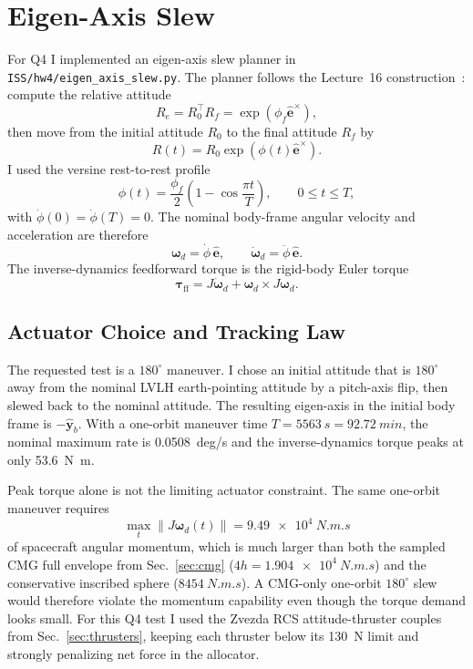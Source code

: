 \documentclass[conference]{IEEEtran}
\begin{document}
\section{Eigen-Axis Slew}
\label{sec:slew}

For Q4 I implemented an eigen-axis slew planner in
\texttt{ISS/hw4/eigen\_axis\_slew.py}.  The planner follows the
Lecture~16 construction~\cite{manchester_l16}: compute the relative
attitude
\[
  R_e = R_0^\top R_f = \exp(\phi_f \hat{\bm e}^{\times}),
\]
then move from the initial attitude $R_0$ to the final attitude $R_f$
by
\begin{equation}
  R(t) = R_0 \exp(\phi(t)\hat{\bm e}^{\times}).
  \label{eq:eigen-axis-path}
\end{equation}
I used the versine rest-to-rest profile
\begin{equation}
  \phi(t) = \frac{\phi_f}{2}\left(1-\cos\frac{\pi t}{T}\right),
  \qquad 0 \le t \le T ,
  \label{eq:versine}
\end{equation}
with $\dot\phi(0)=\dot\phi(T)=0$.  The nominal body-frame angular
velocity and acceleration are therefore
\[
  \bm\omega_d = \dot\phi\,\hat{\bm e}, \qquad
  \dot{\bm\omega}_d = \ddot\phi\,\hat{\bm e}.
\]
The inverse-dynamics feedforward torque is the rigid-body Euler torque
\begin{equation}
  \bm\tau_\text{ff}
  = J\dot{\bm\omega}_d
    + \bm\omega_d\times J\bm\omega_d .
  \label{eq:slew-inv-dyn}
\end{equation}

\subsection{Actuator Choice and Tracking Law}

The requested test is a $180^\circ$ maneuver.  I chose an initial
attitude that is $180^\circ$ away from the nominal LVLH earth-pointing
attitude by a pitch-axis flip, then slewed back to the nominal
attitude.  The resulting eigen-axis in the initial body frame is
$-\hat{\bm y}_b$.  With a one-orbit maneuver time
$T=\SI{5563}{s}=\SI{92.72}{min}$, the nominal maximum rate is
\SI{0.0508}{deg/s} and the inverse-dynamics torque peaks at only
\SI{53.6}{N.m}.

Peak torque alone is not the limiting actuator constraint.  The same
one-orbit maneuver requires
\[
  \max_t \|J\bm\omega_d(t)\| = \SI{9.49e4}{N.m.s}
\]
of spacecraft angular momentum, which is much larger than both the
sampled CMG full envelope from Sec.~\ref{sec:cmg}
($4h=\SI{1.904e4}{N.m.s}$) and the conservative inscribed sphere
($\SI{8454}{N.m.s}$).  A CMG-only one-orbit $180^\circ$ slew would
therefore violate the momentum capability even though the torque demand
looks small.  For this Q4 test I used the Zvezda RCS attitude-thruster
couples from Sec.~\ref{sec:thrusters}, keeping each thruster below its
\SI{130}{N} limit and strongly penalizing net force in the allocator.
\end{document}
